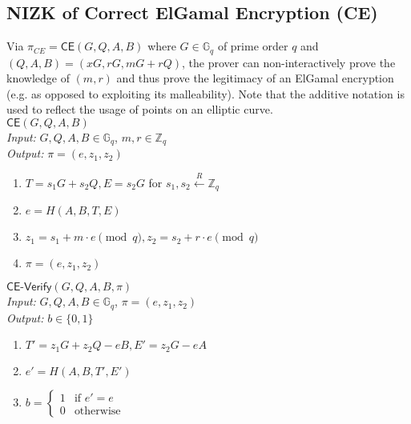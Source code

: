 \documentclass[letterpaper,twocolumn,10pt]{article}
\theoremstyle{definition}
\theoremstyle{remark}
\begin{document}
\subsection{NIZK of Correct ElGamal Encryption (CE)}
\label{appendix:ce}
Via $\pi_{CE} = \mathsf{CE}(G, Q, A, B)$ \cite{cherniaeva2019homomorphic} where $G \in \mathbb{G}_q$ of prime order $q$ and $(Q, A, B) = (x G, r G, m G + r Q)$, the prover can non-interactively prove the knowledge of $(m, r)$ and thus prove the legitimacy of an ElGamal encryption (e.g. as opposed to exploiting its malleability). Note that the additive notation is used to reflect the usage of points on an elliptic curve.\\

\noindent\underline{$\mathsf{CE}(G, Q, A, B)$}\\
\textit{Input:} $G, Q, A, B \in \mathbb{G}_q$, $m, r \in \mathbb{Z}_q$\\
\textit{Output:} $\pi = (e, z_1, z_2)$
\begin{enumerate}
\item $T = s_1 G + s_2 Q, E = s_2 G$ for $s_1, s_2 \xleftarrow{R} \mathbb{Z}_q$
\item $e = H(A, B, T, E)$
\item $z_1 = s_1 + m \cdot e \pmod q, z_2 = s_2 + r \cdot e \pmod q$
\item $\pi = (e, z_1, z_2)$
\end{enumerate}

\noindent\underline{$\mathsf{CE}\text{-}\mathsf{Verify}(G, Q, A, B, \pi)$}\\
\textit{Input:} $G, Q, A, B \in \mathbb{G}_q$, $\pi = (e, z_1, z_2)$\\
\textit{Output:} $b \in \{0, 1\}$
\begin{enumerate}
\item $T' = z_1 G + z_2 Q - e B, E' = z_2 G - e A$
\item $e' = H(A, B, T', E')$
\item $b = \begin{cases}
1 & \text{if $e' = e$}\\
0 & \text{otherwise}
\end{cases}$
\end{enumerate}
\end{document}
